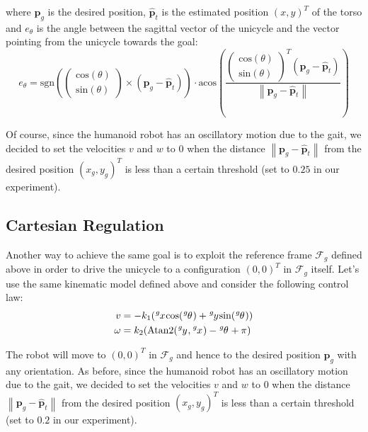\documentclass[a4paper]{article}
\begin{document}
\noindent where $\bm{p}_g$ is the desired position, $\bm{\hat{p}}_t$ is
the estimated position $(x, y)^T$ of the torso and $e_{\theta}$ is the angle
between the sagittal vector of the
unicycle and the vector pointing from the unicycle towards the goal:
\begin{equation}
    e_{\theta} = \text{sgn}\left(
        \begin{pmatrix}
            \text{cos}(\theta) \\
            \text{sin}(\theta)
        \end{pmatrix}
    \times (\bm{p}_g - \bm{\hat{p}}_t)
    \right) \cdot
    \text{acos}\left(
        \frac{
        \begin{pmatrix}
            \text{cos}(\theta) \\
            \text{sin}(\theta)
        \end{pmatrix}^T (\bm{p}_g - \bm{\hat{p}}_t)
        }{\left\|\bm{p}_g - \bm{\hat{p}}_t\right\|}
    \right)
\end{equation}

Of course, since the humanoid robot has an oscillatory motion due to the
gait, we decided to set the velocities $v$ and $w$ to $0$ when the distance
$\left\|\bm{p}_g - \bm{\hat{p}}_t \right\|$
from the desired position $(x_g, y_g)^T$ is less than a certain threshold (set
to $0.25$ in our experiment).

\subsection{Cartesian Regulation}
\label{subsec:cartesian_regulation}
Another way to achieve the same goal is to exploit the reference frame
$\mathcal{F}_g$ defined above in order to drive the unicycle to a configuration
$(0, 0)^T$ in $\mathcal{F}_g$ itself. Let's use the same kinematic model
defined above and consider the following control law:
\begin{align}
    \label{eq:cartesian-regulation-control-law-v}
    v &= -k_1 (\tensor[^g]{x}{} \text{cos}(\tensor[^g]{\theta}{}) + \tensor[^g]{y}{} \text{sin}(\tensor[^g]{\theta}{})) \\
    \label{eq:cartesian-regulation-control-law-w}
    \omega &=  k_2 (\text{Atan2}(\tensor[^g]{y}{}, \tensor[^g]{x}{}) - \tensor[^g]{\theta}{} + \pi)
\end{align}

The robot will move to $(0, 0)^T$ in $\mathcal{F}_g$ and hence to the desired
position $\bm{p}_g$ with any orientation. As before, since the humanoid robot
has an oscillatory motion due to the
gait, we decided to set the velocities $v$ and $w$ to $0$ when the distance
$\left\|\bm{p}_g - \bm{\hat{p}}_t \right\|$
from the desired position $(x_g, y_g)^T$ is less than a certain threshold (set
to $0.2$ in our experiment).
\end{document}
